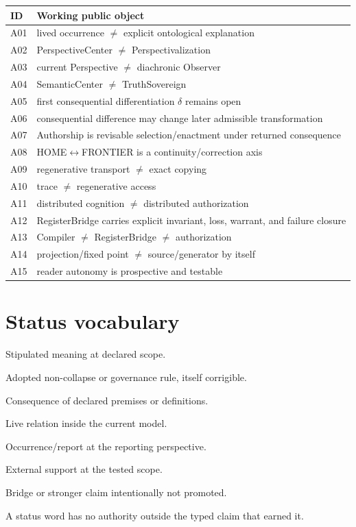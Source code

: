 \documentclass[11pt]{article}
\begin{document}
\begin{center}
\begin{tabularx}{0.96\textwidth}{lX}
\toprule
ID & Working public object \\
\midrule
A01 & lived occurrence $\neq$ explicit ontological explanation \\
A02 & PerspectiveCenter $\neq$ Perspectivalization \\
A03 & current Perspective $\neq$ diachronic Observer \\
A04 & SemanticCenter $\neq$ TruthSovereign \\
A05 & first consequential differentiation $\delta$ remains open \\
A06 & consequential difference may change later admissible transformation \\
A07 & Authorship is revisable selection/enactment under returned consequence \\
A08 & HOME$\leftrightarrow$FRONTIER is a continuity/correction axis \\
A09 & regenerative transport $\neq$ exact copying \\
A10 & trace $\neq$ regenerative access \\
A11 & distributed cognition $\neq$ distributed authorization \\
A12 & RegisterBridge carries explicit invariant, loss, warrant, and failure closure \\
A13 & Compiler $\neq$ RegisterBridge $\neq$ authorization \\
A14 & projection/fixed point $\neq$ source/generator by itself \\
A15 & reader autonomy is prospective and testable \\
\bottomrule
\end{tabularx}
\end{center}

\section{Status vocabulary}

\begin{description}[style=nextline,leftmargin=3.2cm]
\item[DEFINED] Stipulated meaning at declared scope.
\item[CONSTITUTIONAL] Adopted non-collapse or governance rule, itself corrigible.
\item[DERIVED] Consequence of declared premises or definitions.
\item[MODEL-CANDIDATE] Live relation inside the current model.
\item[PHEN-TRUE] Occurrence/report at the reporting perspective.
\item[EMP-SUPPORTED] External support at the tested scope.
\item[WITHHOLD] Bridge or stronger claim intentionally not promoted.
\end{description}

A status word has no authority outside the typed claim that earned it.

\printbibliography
\end{document}

